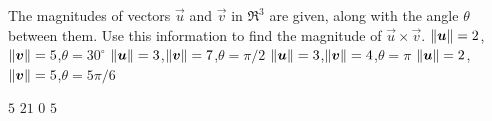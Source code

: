 
\begin{Exercise}[
name={},
title={}, 
difficulty=0,
origin={\cite{GHC}}]
The magnitudes of vectors $\vec u$ and $\vec v$ in $\Re^3$ are given, along with the angle $\theta$ between them. Use this information to find the magnitude of $\vec u\times\vec v$.
\Question $\lVert\bm{u}\rVert = 2$,\quad $\lVert\bm{v}\rVert = 5$,\quad $\theta = 30^\circ$
\Question $\lVert\bm{u}\rVert = 3$,\quad $\lVert\bm{v}\rVert = 7$,\quad $\theta = \pi/2$
\Question $\lVert\bm{u}\rVert = 3$,\quad $\lVert\bm{v}\rVert = 4$,\quad $\theta = \pi$
\Question $\lVert\bm{u}\rVert = 2$,\quad $\lVert\bm{v}\rVert = 5$,\quad $\theta = 5\pi/6$

\end{Exercise}

\begin{Answer}
\Question $5$
\Question $21$
\Question $0$
\Question $5$
\end{Answer}
